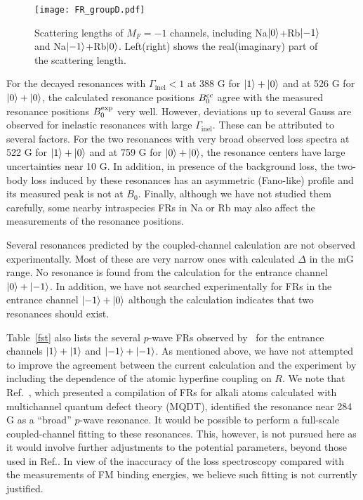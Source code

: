 \begin{figure}[htb]
\begin{center}
\texttt{[image: FR\_groupD.pdf]}
\end{center}
\caption[Scattering lengths of $M_F=-1$ channels]{Scattering lengths of $M_F=-1$ channels, including Na$\ket{0}$+Rb$\ket{-1}$ and Na$\ket{-1}$+Rb$\ket{0}$. Left(right) shows the real(imaginary) part of the scattering length.}
\label{FR_groupD}
\end{figure}

For the decayed resonances with $\Gamma_\textrm{inel} <1$ at 388 G for $\ket{1}+\ket{0}$ and at 526 G for $\ket{0}+\ket{0}$, the calculated resonance positions $B_0^{\rm cc}$ agree with the measured resonance positions $B_0^{\rm exp}$ very well. However, deviations up to several Gauss are observed for inelastic resonances with large $\Gamma_\textrm{inel}$. These can be attributed to several factors. For the two resonances with very broad observed loss spectra at 522 G for $\ket{1}+\ket{0}$ and at 759 G for $\ket{0}+\ket{0}$, the resonance centers have large uncertainties near 10 G. In addition, in presence of the background loss, the two-body loss induced by these resonances has an asymmetric (Fano-like) profile and its measured peak is not at $B_0$. Finally, although we have not studied them carefully, some nearby intraspecies FRs in Na or Rb may also affect the measurements of the resonance positions.

Several resonances predicted by the coupled-channel calculation are not observed experimentally. Most of these are very narrow ones with calculated $\Delta$ in the mG range. No resonance is found from the calculation for the entrance channel $\ket{0}+\ket{-1}$. In addition, we have not searched experimentally for FRs in the entrance channel $\ket{-1}+\ket{0}$ although the calculation indicates that two resonances should exist.

Table~\ref{fst} also lists the several $p$-wave FRs observed by~\cite{Wang2013} for the entrance channels $\ket{1}+\ket{1}$ and $\ket{-1}+\ket{-1}$. As mentioned above, we have not attempted to improve the agreement between the current calculation and the experiment by including the dependence of the atomic hyperfine coupling on $R$. We note that Ref.~\cite{Cui2018}, which presented a compilation of FRs for alkali atoms calculated with multichannel quantum defect theory (MQDT), identified the resonance near 284 G as a ``broad'' $p$-wave resonance. It would be possible to perform a full-scale coupled-channel fitting to these resonances. This, however, is not pursued here as it would involve further adjustments to the potential parameters, beyond those used in Ref.\cite{guo2021leehuangyang}. In view of the inaccuracy of the loss spectroscopy compared with the measurements of FM binding energies, we believe such fitting is not currently justified.

